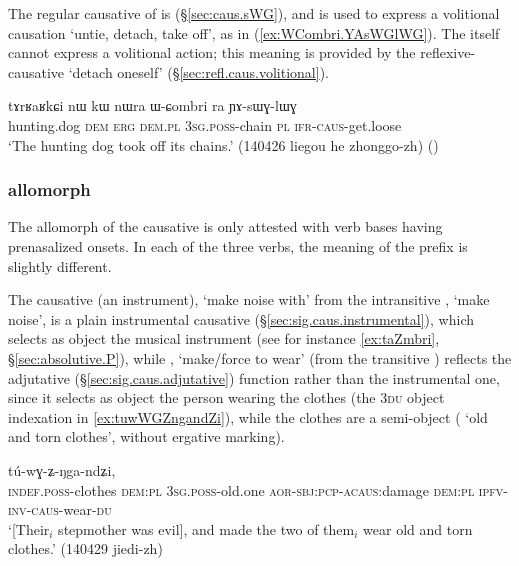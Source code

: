 The regular causative of  is  (§\ref{sec:caus.sWG}), and is used to express a volitional causation `untie, detach, take off', as in (\ref{ex:WCombri.YAsWGlWG}). The  itself cannot express a volitional action; this meaning is provided by the reflexive-causative  `detach oneself' (§\ref{sec:refl.caus.volitional}).

\begin{exe}
\ex \label{ex:WCombri.YAsWGlWG}
\gll tɤrʁaʁkɕi nɯ kɯ nɯra ɯ-ɕombri ra ɲɤ-sɯɣ-lɯɣ \\
hunting.dog \textsc{dem} \textsc{erg} \textsc{dem}.\textsc{pl} \textsc{3sg}.\textsc{poss}-chain \textsc{pl} \textsc{ifr}-\textsc{caus}-get.loose \\
\glt `The hunting dog took off its chains.' (140426 liegou he zhonggo-zh)
()
\end{exe}


\subsubsection{ allomorph} \label{sec:caus.Z}
The  allomorph of the causative is only attested with verb bases having prenasalized onsets. In each of the three verbs, the meaning of the prefix is slightly different.
 
The causative  (an instrument), `make noise with' from the intransitive , `make noise', is a plain instrumental causative (§\ref{sec:sig.caus.instrumental}), which selects as object the musical instrument (see for instance \ref{ex:taZmbri}, §\ref{sec:absolutive.P}), while , `make/force to wear'  (from the transitive ) reflects the  adjutative  (§\ref{sec:sig.caus.adjutative}) function rather than the instrumental one, since it selects as object the person wearing the clothes (the \textsc{3du} object indexation in \ref{ex:tuwWGZngandZi}), while the clothes are a semi-object ( `old and torn clothes', without ergative marking).

\begin{exe}
\ex \label{ex:tuwWGZngandZi}
 tú-wɣ-ʑ-ŋga-ndʑi, \\
\textsc{indef}.\textsc{poss}-clothes \textsc{dem}:\textsc{pl} \textsc{3sg}.\textsc{poss}-old.one \textsc{aor}-\textsc{sbj}:\textsc{pcp}-\textsc{acaus}:damage \textsc{dem}:\textsc{pl} \textsc{ipfv}-\textsc{inv}-\textsc{caus}-wear-\textsc{du} \\
\glt `[Their$_i$ stepmother was evil], and made the two of them$_i$ wear old and torn clothes.' (140429 jiedi-zh)
\end{exe}

